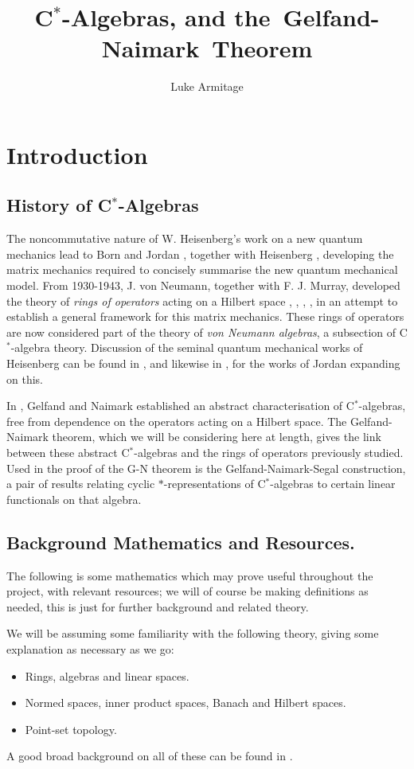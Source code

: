 \documentclass[12pt,a4paper]{amsart}
\author{Luke Armitage}
\title{C$^\ast$-Algebras, and the~Gelfand-Naimark~Theorem}
\theoremstyle{plain}
\theoremstyle{definition}
\begin{document}
\maketitle
\section{Introduction}
\subsection{History of C$^\ast$-Algebras}
	The noncommutative nature of W. Heisenberg's work on a new quantum mechanics \cite{heisenberg25} lead to Born and Jordan \cite{bornjordan25}, together with Heisenberg \cite{bornjordanheisenberg25}, developing the matrix mechanics required to concisely summarise the new quantum mechanical model. 
	From 1930-1943, J. von Neumann, together with F. J. Murray, developed the theory of \emph{rings of operators} acting on a Hilbert space \cite{vonneumann35}, \cite{vonneumann37}, \cite{vonneumann40}, \cite{vonneumann43}, in an attempt to establish a general framework for this matrix mechanics.
	These rings of operators are now considered part of the theory of \emph{von Neumann algebras}, a subsection of C$^\ast$-algebra theory. 
	Discussion of the seminal quantum mechanical works of Heisenberg can be found in \cite{mackinnon77}, and likewise in \cite{schroer03}, for the works of Jordan expanding on this.
	
	In \cite{gelfand43}, Gelfand and Naimark established an abstract characterisation of C$^\ast$-algebras, free from dependence on the operators acting on a Hilbert space.
	The Gelfand-Naimark theorem, which we will be considering here at length, gives the link between these abstract C$^\ast$-algebras and the rings of operators previously studied.
	Used in the proof of the G-N theorem is the Gelfand-Naimark-Segal construction, a pair of results relating cyclic $\ast$-representations of C$^\ast$-algebras to certain linear functionals on that algebra. 
	
	
\subsection{Background Mathematics and Resources.}	
	The following is some mathematics which may prove useful throughout the project, with relevant resources; we will of course be making definitions as needed, this is just for further background and related theory.

	We will be assuming some familiarity with the following theory, giving some explanation as necessary as we go:
\begin{itemize}
	\item Rings, algebras and linear spaces.
	\item Normed spaces, inner product spaces, Banach and Hilbert spaces.
	\item Point-set topology.
\end{itemize}
	A good broad background on all of these can be found in \cite{simmons83}.
\end{document}
